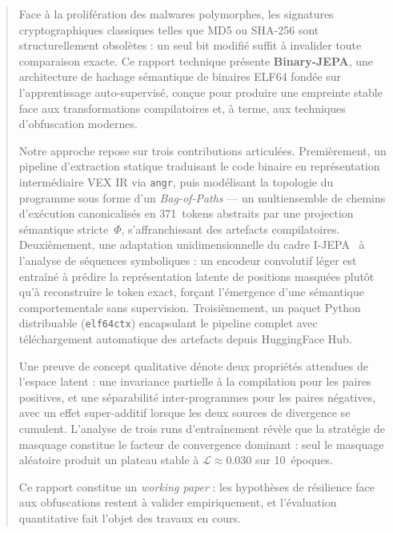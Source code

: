 \begin{abstract}
  \vspace*{1em}
  Face à la prolifération des malwares polymorphes, les signatures cryptographiques
classiques telles que MD5 ou SHA-256 sont structurellement obsolètes : un seul bit
modifié suffit à invalider toute comparaison exacte.
Ce rapport technique présente
\textbf{Binary-JEPA}, une architecture de hachage sémantique de binaires ELF64 fondée
sur l'apprentissage auto-supervisé, conçue pour produire une empreinte stable face aux
transformations compilatoires et, à terme, aux techniques d'obfuscation modernes.

Notre approche repose sur trois contributions articulées. Premièrement, un pipeline
d'extraction statique traduisant le code binaire en représentation intermédiaire VEX IR
via \texttt{angr}, puis modélisant la topologie du programme sous forme d'un
\textit{Bag-of-Paths} — un multiensemble de chemins d'exécution canonicalisés en
371~tokens abstraits par une projection sémantique stricte~$\Phi$, s'affranchissant des
artefacts compilatoires. Deuxièmement, une adaptation unidimensionnelle du cadre
I-JEPA~\cite{assran2023self} à l'analyse de séquences symboliques : un encodeur
convolutif léger est entraîné à prédire la représentation latente de positions masquées
plutôt qu'à reconstruire le token exact, forçant l'émergence d'une sémantique
comportementale sans supervision. Troisièmement, un paquet Python distribuable
(\texttt{elf64ctx}) encapsulant le pipeline complet avec téléchargement automatique
des artefacts depuis HuggingFace Hub.

Une preuve de concept qualitative dénote deux propriétés
attendues de l'espace latent : une invariance partielle à la compilation pour les paires
positives, et une séparabilité inter-programmes pour les
paires négatives, avec un effet super-additif lorsque les deux sources de divergence se cumulent. L'analyse de trois runs
d'entraînement révèle que la stratégie de masquage constitue le facteur de convergence
dominant : seul le masquage aléatoire produit un plateau stable à
$\mathcal{L} \approx 0.030$ sur 10~époques.

Ce rapport constitue un \textit{working paper} : les hypothèses de résilience face aux
obfuscations restent à valider empiriquement, et l'évaluation quantitative fait l'objet des travaux en cours. 
\end{abstract}

